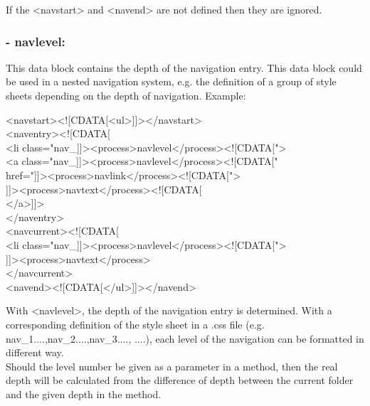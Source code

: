   If the {\tag <navstart>} and {\tag <navend>} are not defined then they are ignored. \\

\subsubsection{- navlevel:} 

  This data block contains the depth of the navigation entry. This data 
block could be used in a nested navigation system, e.g. the definition of a 
group of style sheets depending on the depth of navigation. Example: \\

  \begin{xml}
  <navstart><![CDATA[<ul>]]></navstart> \\
  <naventry><![CDATA[ \\
  \xtaba <li class="nav\_]]><process>navlevel</process><![CDATA["> \\
  \xtaba <a class="nav\_]]><process>navlevel</process><![CDATA[" \\
  \xtaba href="]]><process>navlink</process><![CDATA["> \\
  \xtabb ]]><process>navtext</process><![CDATA[ \\
  \xtaba </a>]]> \\
  </naventry> \\
  <navcurrent><![CDATA[ \\
      <li class="nav\_]]><process>navlevel</process><![CDATA["> \\
      ]]><process>navtext</process> \\
  </navcurrent>\\
  <navend><![CDATA[</ul>]]></navend>\\
  \end{xml}

  With <navlevel>, the depth of the navigation entry is determined. 
With a corresponding definition of the style sheet in a .css 
file (e.g. nav\_1{....},nav\_2{....},nav\_3{....}, ....), each level 
of the navigation can be formatted in different way. \\

  Should the level number be given as a parameter in a method, then 
the real depth will be calculated from the difference of depth 
between the current folder and the given depth in the method. \\

